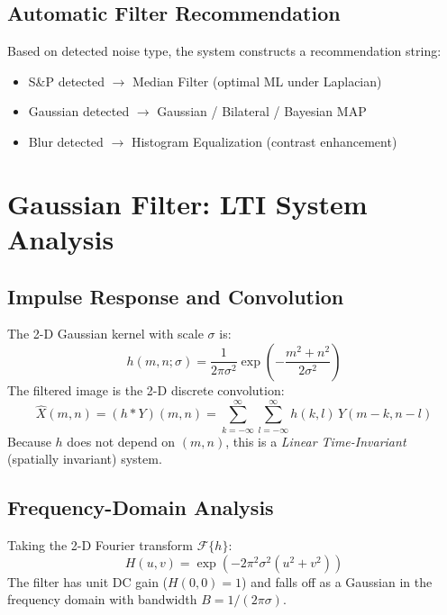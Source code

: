 \documentclass[10pt,conference]{IEEEtran}
\begin{document}
\subsection{Automatic Filter Recommendation}
Based on detected noise type, the system constructs a recommendation string:
\begin{itemize}
\item S\&P detected $\rightarrow$ Median Filter (optimal ML under Laplacian)
\item Gaussian detected $\rightarrow$ Gaussian / Bilateral / Bayesian MAP
\item Blur detected $\rightarrow$ Histogram Equalization (contrast enhancement)
\end{itemize}

\section{Gaussian Filter: LTI System Analysis}

\subsection{Impulse Response and Convolution}
The 2-D Gaussian kernel with scale $\sigma$ is:
\begin{equation}
h(m,n;\sigma) = \frac{1}{2\pi\sigma^2}\exp\!\left(-\frac{m^2+n^2}{2\sigma^2}\right)
\end{equation}
The filtered image is the 2-D discrete convolution:
\begin{equation}
\hat{X}(m,n) = (h * Y)(m,n) = \sum_{k=-\infty}^{\infty}\sum_{l=-\infty}^{\infty} h(k,l)\,Y(m-k,n-l)
\end{equation}
Because $h$ does not depend on $(m,n)$, this is a \emph{Linear Time-Invariant} (spatially invariant) system.

\subsection{Frequency-Domain Analysis}
Taking the 2-D Fourier transform $\mathcal{F}\{h\}$:
\begin{equation}
H(u,v) = \exp\!\left(-2\pi^2\sigma^2(u^2+v^2)\right)
\end{equation}
The filter has unit DC gain ($H(0,0)=1$) and falls off as a Gaussian in the frequency domain with bandwidth $B = 1/(2\pi\sigma)$.
\end{document}
